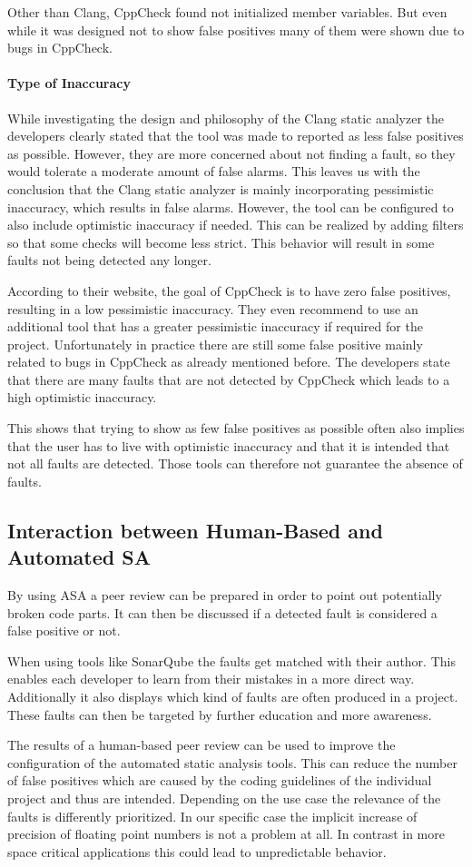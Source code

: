 \documentclass{scrartcl}
\begin{document}
Other than Clang, CppCheck found not initialized member variables. But even while it was designed not to show false positives many of them were shown due to bugs in CppCheck.

\paragraph{Type of Inaccuracy}

While investigating the design and philosophy of the Clang static analyzer the developers clearly stated that the tool was made to reported as less false positives as possible. However, they are more concerned about not finding a fault, so they would tolerate a moderate amount of false alarms. This leaves us with the conclusion that the Clang static analyzer is mainly incorporating pessimistic inaccuracy, which results in false alarms. However, the tool can be configured to also include optimistic inaccuracy if needed. This can be realized by adding filters so that some checks will become less strict. This behavior will result in some faults not being detected any longer.

According to their website, the goal of CppCheck is to have zero false positives, resulting in a low pessimistic inaccuracy. They even recommend to use an additional tool that has a greater pessimistic inaccuracy if required for the project. Unfortunately in practice there are still some false positive mainly related to bugs in CppCheck as already mentioned before. The developers state that there are many faults that are not detected by CppCheck which leads to a high optimistic inaccuracy.

This shows that trying to show as few false positives as possible often also implies that the user has to live with optimistic inaccuracy and that it is intended that not all faults are detected. Those tools can therefore not guarantee the absence of faults.

\subsection{Interaction between Human-Based and Automated SA}

By using ASA a peer review can be prepared in order to point out potentially broken code parts. It can then be discussed if a detected fault is considered a false positive or not.

When using tools like SonarQube the faults get matched with their author. This enables each developer to learn from their mistakes in a more direct way. Additionally it also displays which kind of faults are often produced in a project. These faults can then be targeted by further education and more awareness.

The results of a human-based peer review can be used to improve the configuration of the automated static analysis tools. This can reduce the number of false positives which are caused by the coding guidelines of the individual project and thus are intended.
Depending on the use case the relevance of the faults is differently prioritized. In our specific case the implicit increase of precision of floating point numbers is not a problem at all. In contrast in more space critical applications this could lead to unpredictable behavior.
\end{document}
